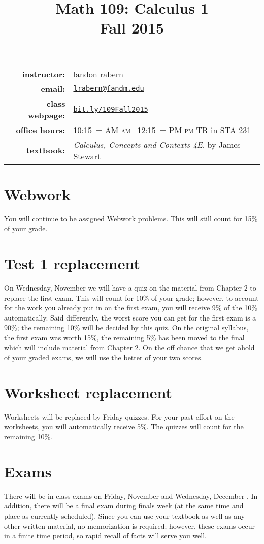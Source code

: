 \documentclass[10pt]{article}
\title{Math 109: Calculus 1\\ \bigskip\small{Fall 2015}}
\date{}
\makeatletter
\DeclareRobustCommand{\maybefakesc}[1]{%
  \ifnum\pdfstrcmp{\f@series}{\bfdefault}=\z@
    {\fontsize{\dimexpr0.8\dimexpr\f@size pt\relax}{0}\selectfont\uppercase{#1}}%
  \else
    \textsc{#1}%
  \fi
}
\newcommand\AM{\,\maybefakesc{am}\xspace}
\newcommand\PM{\,\maybefakesc{pm}\xspace}
\makeatother
\begin{document}
\maketitle

\begin{tabular}{r l}
\textbf{instructor:}& landon rabern\\
\textbf{email:}& \href{mailto:lrabern@fandm.edu}{\nolinkurl{lrabern@fandm.edu}}\\
\textbf{class webpage:}& \href{http://bit.ly/109Fall2015}{\nolinkurl{bit.ly/109Fall2015}}\\
\textbf{office hours:}&  10:15\AM--12:15\PM TR in STA 231\\
\textbf{textbook:}&\textit{Calculus, Concepts and Contexts 4E}, by James Stewart\\
\end{tabular}

\section*{Webwork} 
You will continue to be assigned Webwork problems. This will still count for 15\% of your grade.
\section*{Test 1 replacement}
On Wednesday, November  we will have a quiz on the material from Chapter 2 to replace the first exam. This will count for 10\% of your grade; however, to account for the work you already put in on the first exam, you will receive 9\% of the 10\% automatically.  Said differently, the worst score you can get for the first exam is a 90\%; the remaining 10\% will be decided by this quiz.  On the original syllabus, the first exam was worth 15\%, the remaining 5\% has been moved to the final which will include material from Chapter 2.  On the off chance that we get ahold of your graded exams, we will use the better of your two scores. 

\section*{Worksheet replacement}
Worksheets will be replaced by Friday quizzes. For your past effort on the worksheets, you will automatically receive 5\%.  The quizzes will count for the remaining 10\%.

\section*{Exams}
There will be in-class exams on Friday, November  and Wednesday, December .  In addition, there will be a final exam during finals week (at the same time and place as currently scheduled).
Since you can use your textbook as well as any other written material, no memorization is required; however, these exams occur in a finite time period, so rapid recall of facts will serve you well. 
\end{document}
